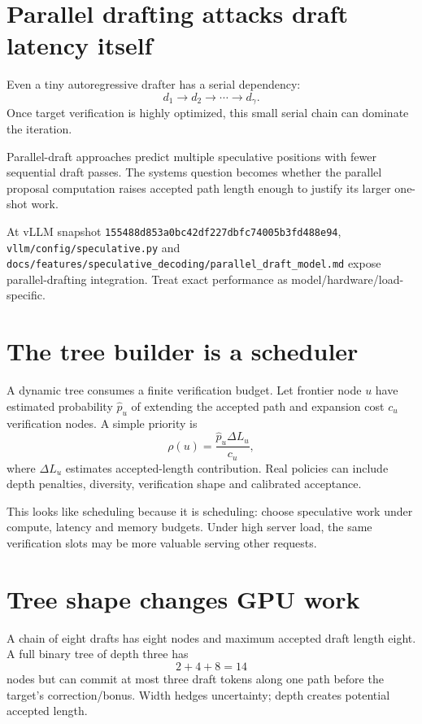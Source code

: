 \section{Parallel drafting attacks draft latency itself}

Even a tiny autoregressive drafter has a serial dependency:
\[
d_1\rightarrow d_2\rightarrow\cdots\rightarrow d_\gamma.
\]
Once target verification is highly optimized, this small serial chain can dominate the
iteration.

Parallel-draft approaches predict multiple speculative positions with fewer sequential
draft passes. The systems question becomes whether the parallel proposal computation
raises accepted path length enough to justify its larger one-shot work.

At vLLM snapshot \texttt{155488d853a0bc42df227dbfc74005b3fd488e94},
\texttt{vllm/config/speculative.py} and
\texttt{docs/features/speculative\_decoding/parallel\_draft\_model.md} expose
parallel-drafting integration. Treat exact performance as model/hardware/load-specific.

\section{The tree builder is a scheduler}

A dynamic tree consumes a finite verification budget. Let frontier node $u$ have
estimated probability $\hat p_u$ of extending the accepted path and expansion cost
$c_u$ verification nodes. A simple priority is
\[
\rho(u)=\frac{\hat p_u\Delta L_u}{c_u},
\]
where $\Delta L_u$ estimates accepted-length contribution. Real policies can include
depth penalties, diversity, verification shape and calibrated acceptance.

This looks like scheduling because it is scheduling: choose speculative work under
compute, latency and memory budgets. Under high server load, the same verification
slots may be more valuable serving other requests.

\section{Tree shape changes GPU work}

A chain of eight drafts has eight nodes and maximum accepted draft length eight. A full
binary tree of depth three has
\[
2+4+8=14
\]
nodes but can commit at most three draft tokens along one path before the target's
correction/bonus. Width hedges uncertainty; depth creates potential accepted length.

